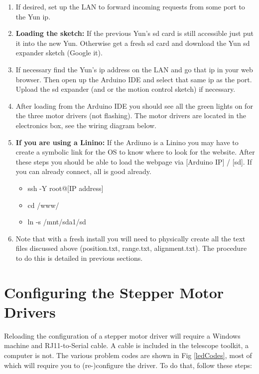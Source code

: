 \documentclass[11pt]{article}
\begin{document}
\begin{enumerate}
\item If desired, set up the LAN to forward incoming requests from some port to the Yun ip.\\
\item \textbf{Loading the sketch:} If the previous Yun's sd card is still accessible just put it into the new Yun. Otherwise get a fresh sd card and download the Yun sd expander sketch (Google it).
\item If necessary find the Yun's ip address on the LAN and go that ip in your web browser. Then open up the Arduino IDE and select that same ip as the port. Upload the sd expander (and or the motion control sketch) if necessary.

\item After loading from the Arduino IDE you should see all the green lights on for the three motor drivers (not flashing).  
The motor drivers are located in the electronics box, see the wiring diagram below.

\item {\textbf{If you are using a Linino:}}  If the Ardiuno is a Linino you may have to create a symbolic link for the OS to know where to look for the website.  
After these steps you should be able to load the webpage via [Arduino IP] / [sd].  
If you can already connect, all is good already.
	\begin{itemize}
		\item ssh -Y root@[IP address]
		\item cd /www/
		\item ln -s /mnt/sda1/sd
	\end{itemize}
	
\item Note that with a fresh install you will need to physically create all the text files discussed above (position.txt, range.txt, alignment.txt).
	The procedure to do this is detailed in previous sections.
\end{enumerate}


\section{Configuring the Stepper Motor Drivers}
\label{SecConfig}

Reloading the configuration of a stepper motor driver will require a Windows machine and RJ11-to-Serial cable.
A cable is included in the telescope toolkit, a computer is not.
The various problem codes are shown in Fig \ref{ledCodes}, most of which will require you to (re-)configure the driver.
To do that, follow these steps:
\end{document}
